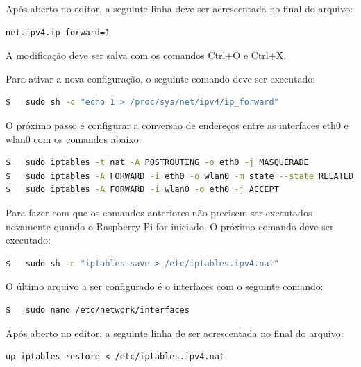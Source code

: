 Após aberto no editor, a seguinte linha deve ser acrescentada no final do arquivo: \\

\begin{lstlisting}
net.ipv4.ip_forward=1
\end{lstlisting}

A modificação deve ser salva com os comandos Ctrl+O e Ctrl+X.

Para ativar a nova configuração, o seguinte comando deve ser executado: \\

\begin{lstlisting}[language=bash]
$   sudo sh -c "echo 1 > /proc/sys/net/ipv4/ip_forward"
\end{lstlisting}

O próximo passo é configurar a conversão de endereços entre as interfaces eth0 e wlan0 com os comandos abaixo: \\

\begin{lstlisting}[language=bash]
$   sudo iptables -t nat -A POSTROUTING -o eth0 -j MASQUERADE
$   sudo iptables -A FORWARD -i eth0 -o wlan0 -m state --state RELATED,ESTABLISHED -j ACCEPT
$   sudo iptables -A FORWARD -i wlan0 -o eth0 -j ACCEPT
\end{lstlisting}

Para fazer com que os comandos anteriores não precisem ser executados novamente quando o Raspberry Pi for iniciado. O próximo comando deve ser executado: \\

\begin{lstlisting}[language=bash]
$   sudo sh -c "iptables-save > /etc/iptables.ipv4.nat"
\end{lstlisting}

O último arquivo a ser configurado é o interfaces com o seguinte comando: \\

\begin{lstlisting}[language=bash]
$   sudo nano /etc/network/interfaces
\end{lstlisting}

Após aberto no editor, a seguinte linha de ser acrescentada no final do arquivo: \\

\begin{lstlisting}
up iptables-restore < /etc/iptables.ipv4.nat
\end{lstlisting}

